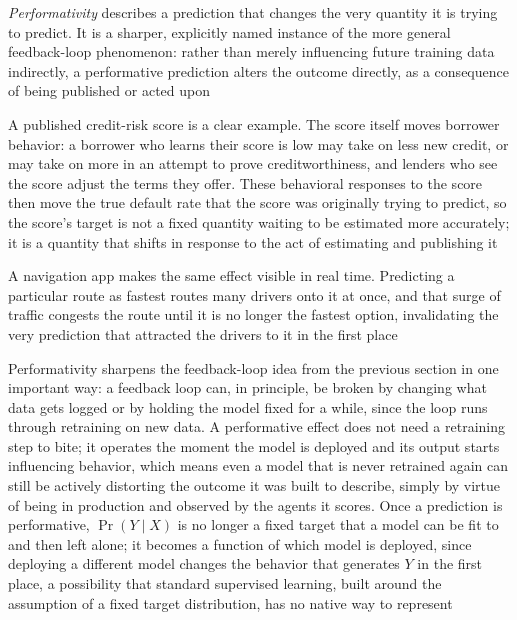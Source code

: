 \begin{definition}
  \emph{Performativity} describes a prediction that changes the very quantity it
  is trying to predict. It is a sharper, explicitly named instance of the more
  general feedback-loop phenomenon: rather than merely influencing future training
  data indirectly, a performative prediction alters the outcome directly, as a consequence
  of being published or acted upon
\end{definition}

A published credit-risk score is a clear example. The score itself moves
borrower behavior: a borrower who learns their score is low may take on less new
credit, or may take on more in an attempt to prove creditworthiness, and lenders
who see the score adjust the terms they offer. These behavioral responses to the
score then move the true default rate that the score was originally trying to
predict, so the score's target is not a fixed quantity waiting to be estimated more
accurately; it is a quantity that shifts in response to the act of estimating
and publishing it

A navigation app makes the same effect visible in real time. Predicting a
particular route as fastest routes many drivers onto it at once, and that surge
of traffic congests the route until it is no longer the fastest option,
invalidating the very prediction that attracted the drivers to it in the first
place

Performativity sharpens the feedback-loop idea from the previous section in one important
way: a feedback loop can, in principle, be broken by changing what data gets
logged or by holding the model fixed for a while, since the loop runs through retraining
on new data. A performative effect does not need a retraining step to bite; it operates
the moment the model is deployed and its output starts influencing behavior,
which means even a model that is never retrained again can still be actively
distorting the outcome it was built to describe, simply by virtue of being in production
and observed by the agents it scores. Once a prediction is performative, $\Pr(Y \mid
X)$ is no longer a fixed target that a model can be fit to and then left alone;
it becomes a function of which model is deployed, since deploying a different model
changes the behavior that generates $Y$ in the first place, a possibility that
standard supervised learning, built around the assumption of a fixed target distribution,
has no native way to represent

